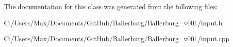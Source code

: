 The documentation for this class was generated from the following files\+:\begin{DoxyCompactItemize}
\item 
C\+:/\+Users/\+Max/\+Documents/\+Git\+Hub/\+Ballerburg/\+Ballerburg\+\_\+v001/input.\+h\item 
C\+:/\+Users/\+Max/\+Documents/\+Git\+Hub/\+Ballerburg/\+Ballerburg\+\_\+v001/input.\+cpp\end{DoxyCompactItemize}
